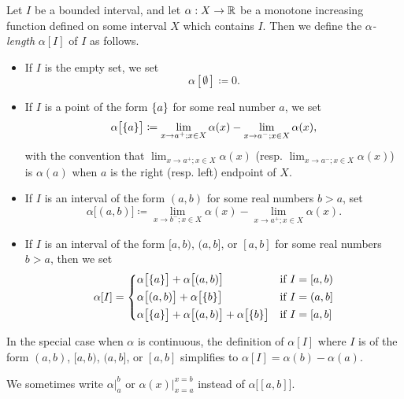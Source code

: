 \begin{defn}\label{i:11.8.1}
  Let \(I\) be a bounded interval, and let \(\alpha : X \to \mathbb{R}\) be a monotone increasing function defined on some interval \(X\) which contains \(I\).
  Then we define the \emph{\(\alpha\)-length} \(\alpha[I]\) of \(I\) as follows.
  \begin{itemize}
    \item If \(I\) is the empty set, we set
          \[
            \alpha[\emptyset] \coloneqq 0.
          \]
    \item If \(I\) is a point of the form \(\left\lbrace a\right\rbrace\) for some real number \(a\), we set
          \[
            \alpha\big[\set{a}\big] \coloneqq \lim_{x \to a^+ ; x \in X} \alpha(x) - \lim_{x \to a^- ; x \in X} \alpha(x),
          \]
          with the convention that \(\lim_{x \to a^+ ; x \in X} \alpha(x)\) (resp. \(\lim_{x \to a^- ; x \in X} \alpha(x)\)) is \(\alpha(a)\) when \(a\) is the right (resp. left) endpoint of \(X\).
    \item If \(I\) is an interval of the form \((a, b)\) for some real numbers \(b > a\), set
          \[
            \alpha\big[(a, b)\big] \coloneqq \lim_{x \to b^- ; x \in X} \alpha(x) - \lim_{x \to a^+ ; x \in X} \alpha(x).
          \]
    \item If \(I\) is an interval of the form \([a, b)\), \((a, b]\), or \([a, b]\) for some real numbers \(b > a\), then we set
          \[
            \alpha[I] = \begin{dcases}
              \alpha\big[\set{a}\big] + \alpha\big[(a, b)\big]                           & \text{if } I = [a, b) \\
              \alpha\big[(a, b)\big] + \alpha\big[\set{b}\big]                           & \text{if } I = (a, b] \\
              \alpha\big[\set{a}\big] + \alpha\big[(a, b)\big] + \alpha\big[\set{b}\big] & \text{if } I = [a, b]
            \end{dcases}
          \]
  \end{itemize}
\end{defn}

\begin{note}
  In the special case when \(\alpha\) is continuous, the definition of \(\alpha[I]\) where \(I\) is of the form \((a, b)\), \([a, b)\), \((a, b]\), or \([a, b]\) simplifies to \(\alpha[I] = \alpha(b) - \alpha(a)\).
\end{note}

\begin{note}
  We sometimes write \(\alpha\big|_a^b\) or \(\alpha(x)\big|_{x = a}^{x = b}\) instead of \(\alpha\big[[a, b]\big]\).
\end{note}

